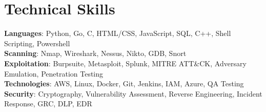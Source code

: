 \documentclass[letterpaper,11pt]{article}
\begin{document}
%
\section{Technical Skills}
 \begin{itemize}[leftmargin=0.15in, label={}]
    \small{\item{
     \textbf{Languages}{: Python, Go, C, HTML/CSS, JavaScript, SQL, C++, Shell Scripting, Powershell} \\
     \textbf{Scanning}{: Nmap, Wireshark, Nessus, Nikto, GDB, Snort} \\
     \textbf{Exploitation}{: Burpsuite, Metasploit, Splunk, MITRE ATT\&CK, Adversary Emulation, Penetration Testing} \\
     \textbf{Technologies}{: AWS, Linux, Docker, Git, Jenkins, IAM, Azure, QA Testing} \\
     \textbf{Security}{: Cryptography, Vulnerability Assessment, Reverse Engineering, Incident Response, GRC, DLP, EDR} \\
    }}
 \end{itemize}
 \vspace{-16pt}
\end{document}
